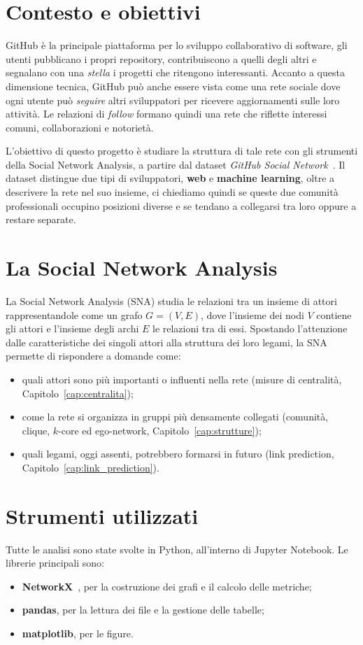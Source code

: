 \documentclass[11pt]{report}
\begin{document}
\section{Contesto e obiettivi}
\label{sec:contesto}
GitHub è la principale piattaforma per lo sviluppo collaborativo di software, gli utenti pubblicano
i propri repository, contribuiscono a quelli degli altri e segnalano con una \emph{stella} i progetti che
ritengono interessanti. Accanto a questa dimensione tecnica, GitHub può anche essere vista come una rete sociale dove
ogni utente può \emph{seguire} altri sviluppatori per ricevere aggiornamenti sulle loro attività. Le relazioni di
\emph{follow} formano quindi una rete che riflette interessi comuni, collaborazioni e notorietà.

L'obiettivo di questo progetto è studiare la struttura di tale rete con gli strumenti della Social Network
Analysis, a partire dal dataset \emph{GitHub Social Network}~\cite{rozemberczki2021musae, snapnets}.
Il dataset distingue due tipi di sviluppatori, \textbf{web} e \textbf{machine learning}, oltre a descrivere la rete nel suo
insieme, ci chiediamo quindi se queste due comunità professionali occupino posizioni diverse e se tendano a
collegarsi tra loro oppure a restare separate.

\section{La Social Network Analysis}
\label{sec:sna}
La Social Network Analysis (SNA) studia le relazioni tra un insieme di attori rappresentandole come un
grafo $G=(V,E)$, dove l'insieme dei nodi $V$ contiene gli attori e l'insieme degli archi $E$ le relazioni
tra di essi. Spostando l'attenzione dalle caratteristiche dei singoli attori alla struttura dei loro
legami, la SNA permette di rispondere a domande come:
\begin{itemize}
  \item quali attori sono più importanti o influenti nella rete (misure di centralità, Capitolo~\ref{cap:centralita});
  \item come la rete si organizza in gruppi più densamente collegati (comunità, clique, $k$-core ed ego-network, Capitolo~\ref{cap:strutture});
  \item quali legami, oggi assenti, potrebbero formarsi in futuro (link prediction, Capitolo~\ref{cap:link_prediction}).
\end{itemize}

\section{Strumenti utilizzati}
\label{sec:strumenti}
Tutte le analisi sono state svolte in Python, all'interno di Jupyter Notebook. Le librerie principali sono:
\begin{itemize}
  \item \textbf{NetworkX}~\cite{hagberg2008networkx}, per la costruzione dei grafi e il calcolo delle metriche;
  \item \textbf{pandas}, per la lettura dei file e la gestione delle tabelle;
  \item \textbf{matplotlib}, per le figure.
\end{itemize}
\end{document}
